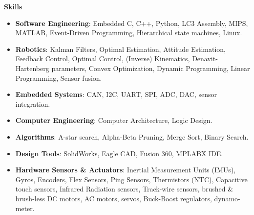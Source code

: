 \documentclass[paper=a4,fontsize=11pt]{article} %
\def \sectionSpace      {0.3cm}    %
\def \subSectionSpace   {0.25cm}     %
\def \leftColSpace      {0.1}       %
\def \bigMiddleColSpace {0.8}       %
\begin{document}
    \noindent
    \begin{minipage}[t]{\leftColSpace\linewidth}
    \noindent \textbf{Skills}\\
    \end{minipage}
    \begin{minipage}[t]{\bigMiddleColSpace\linewidth}
        \begin{itemize}[noitemsep,topsep=0pt]
            \item \noindent \textbf{Software Engineering}: Embedded C, C++, Python, LC3 Assembly, MIPS, MATLAB, Event-Driven Programming, Hierarchical state machines, Linux.
            
            \vspace{\subSectionSpace}
            \item \noindent \textbf{Robotics}: Kalman Filters, Optimal Estimation, Attitude Estimation, Feedback Control, Optimal Control, (Inverse) Kinematics, Denavit-Hartenberg parameters, Convex Optimization, Dynamic Programming, Linear Programming, Sensor fusion.
            
            \vspace{\subSectionSpace}
            \item \noindent \textbf{Embedded Systems}: CAN, I2C, UART, SPI, ADC, DAC, sensor integration.
            
            \vspace{\subSectionSpace}
            \item \noindent \textbf{Computer Engineering}: Computer Architecture, Logic Design.
            
            \vspace{\subSectionSpace}
            \item \noindent \textbf{Algorithms}: A-star search, Alpha-Beta Pruning, Merge Sort, Binary Search.
            
            \vspace{\subSectionSpace}
            \item \noindent \textbf{Design Tools}: SolidWorks, Eagle CAD, Fusion 360, MPLABX IDE.
            
            \vspace{\subSectionSpace}
            \item \noindent \textbf{Hardware Sensors \& Actuators}: Inertial Measurement Units (IMUs), Gyros, Encoders, Flex Sensors, Ping Sensors, Thermistors (NTC), Capacitive touch sensors, Infrared Radiation sensors, Track-wire sensors, brushed \& brush-less DC motors, AC motors, servos, Buck-Boost regulators, dynamo-meter.
        \end{itemize}
    \end{minipage}
\end{document}
